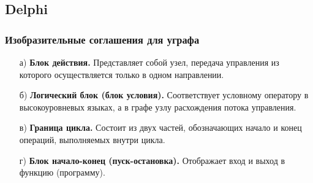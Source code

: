 \documentclass{beamer}
\begin{document}
\subsection{Delphi}
\begin{frame}
\frametitle{Изобразительные соглашения для уграфа}
\footnotesize{
	\begin{enumerate}
		\item[а)]
			\textbf{Блок действия.}  Представляет собой узел, передача управления из которого осуществляется только в одном направлении.
		\item[б)]
			\textbf{Логический блок (блок условия).} Соответствует условному оператору в высокоуровневых языках, а в графе узлу расхождения потока управления.
		\item[в)]
			\textbf{Граница цикла.} Состоит из двух частей, обозначающих начало и конец операций, выполняемых внутри цикла.
		\item[г)]
			\textbf{Блок начало-конец (пуск-остановка).} Отображает вход и выход в функцию (программу).
	\end{enumerate}
}
\begin{figure}[htbp]
	\begin{minipage}[b]{0.24\linewidth}
	\end{minipage}
\hfill
\begin{minipage}[b]{0.24\linewidth}
	\end{minipage}
\begin{minipage}[b]{0.24\linewidth}

\end{minipage}
\end{figure}
\end{frame}
\end{document}
